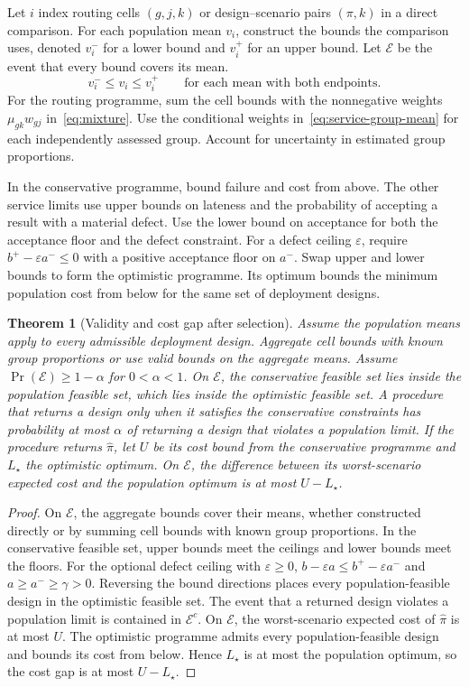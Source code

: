 \documentclass[11pt,reqno]{amsart}
\newtheorem{theorem}{Theorem}[section]
\theoremstyle{definition}
\theoremstyle{remark}
\begin{document}
Let $i$ index routing cells $(g,j,k)$ or design--scenario pairs $(\pi,k)$ in a direct comparison. For each population mean $v_i$, construct the bounds the comparison uses, denoted $v_i^-$ for a lower bound and $v_i^+$ for an upper bound. Let $\mathcal E$ be the event that every bound covers its mean.
\begin{equation}
 v_i^-\le v_i\le v_i^+\qquad\text{for each mean with both endpoints.}
 \label{eq:coverage}
\end{equation}
For the routing programme, sum the cell bounds with the nonnegative weights $\mu_{gk}w_{gj}$ in~\eqref{eq:mixture}. Use the conditional weights in~\eqref{eq:service-group-mean} for each independently assessed group. Account for uncertainty in estimated group proportions.

In the conservative programme, bound failure and cost from above. The other service limits use upper bounds on lateness and the probability of accepting a result with a material defect. Use the lower bound on acceptance for both the acceptance floor and the defect constraint. For a defect ceiling $\varepsilon$, require $b^+-\varepsilon a^-\le0$ with a positive acceptance floor on $a^-$. Swap upper and lower bounds to form the optimistic programme. Its optimum bounds the minimum population cost from below for the same set of deployment designs.

\begin{theorem}[Validity and cost gap after selection]\label{thm:calibration}
Assume the population means apply to every admissible deployment design. Aggregate cell bounds with known group proportions or use valid bounds on the aggregate means. Assume $\Pr(\mathcal E)\ge1-\alpha$ for $0<\alpha<1$. On $\mathcal E$, the conservative feasible set lies inside the population feasible set, which lies inside the optimistic feasible set. A procedure that returns a design only when it satisfies the conservative constraints has probability at most $\alpha$ of returning a design that violates a population limit.
If the procedure returns $\hat\pi$, let $U$ be its cost bound from the conservative programme and $L_\star$ the optimistic optimum. On $\mathcal E$, the difference between its worst-scenario expected cost and the population optimum is at most $U-L_\star$.
\end{theorem}
\begin{proof}
On $\mathcal E$, the aggregate bounds cover their means, whether constructed directly or by summing cell bounds with known group proportions. In the conservative feasible set, upper bounds meet the ceilings and lower bounds meet the floors. For the optional defect ceiling with $\varepsilon\ge0$, $b-\varepsilon a\le b^+-\varepsilon a^-$ and $a\ge a^-\ge\gamma>0$. Reversing the bound directions places every population-feasible design in the optimistic feasible set.
The event that a returned design violates a population limit is contained in $\mathcal E^c$. On $\mathcal E$, the worst-scenario expected cost of $\hat\pi$ is at most $U$. The optimistic programme admits every population-feasible design and bounds its cost from below. Hence $L_\star$ is at most the population optimum, so the cost gap is at most $U-L_\star$.
\end{proof}
\end{document}
